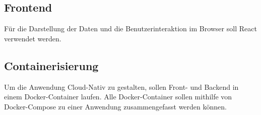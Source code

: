 \documentclass[conference,a4paper]{cs-techrep}
\begin{document}
\subsection{Frontend}
Für die Darstellung der Daten und die Benutzerinteraktion im Browser soll React verwendet werden.
\subsection{Containerisierung}
Um die Anwendung Cloud-Nativ zu gestalten, sollen Front- und Backend in einem Docker-Container laufen. Alle Docker-Container sollen mithilfe von Docker-Compose zu einer Anwendung zusammengefasst werden können.



\sloppy
\printbibliography[notcategory=selfref]
\end{document}
